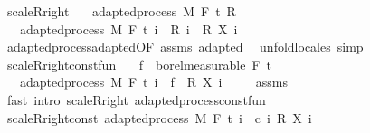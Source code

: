 \begin{isabellebody}
\ scaleR{\isacharunderscore}{\kern0pt}right{\isacharcolon}{\kern0pt}\isanewline
\ \ \ {\isachardoublequoteopen}adapted{\isacharunderscore}{\kern0pt}process\ M\ F\ t\ R{\isachardoublequoteclose}\isanewline
\ \ \ {\isachardoublequoteopen}adapted{\isacharunderscore}{\kern0pt}process\ M\ F\ t\ {\isacharparenleft}{\kern0pt}{\isasymlambda}i\ {\isasymxi}{\isachardot}{\kern0pt}\ {\isacharparenleft}{\kern0pt}R\ i\ {\isasymxi}{\isacharparenright}{\kern0pt}\ {\isacharasterisk}{\kern0pt}\isactrlsub R\ {\isacharparenleft}{\kern0pt}X\ i\ {\isasymxi}{\isacharparenright}{\kern0pt}{\isacharparenright}{\kern0pt}{\isachardoublequoteclose}\isanewline
%
\isadelimproof
\ \ %
\endisadelimproof
%
\isatagproof
{}\isamarkupfalse%
\ adapted{\isacharunderscore}{\kern0pt}process{\isachardot}{\kern0pt}adapted{\isacharbrackleft}{\kern0pt}OF\ assms{\isacharbrackright}{\kern0pt}\ adapted\ \isamarkupfalse%
\ {\isacharparenleft}{\kern0pt}unfold{\isacharunderscore}{\kern0pt}locales{\isacharparenright}{\kern0pt}\ simp%
\endisatagproof
{\isafoldproof}%
%
\isadelimproof
\isanewline
%
\endisadelimproof
\ \ \isanewline
{}\isamarkupfalse%
\ scaleR{\isacharunderscore}{\kern0pt}right{\isacharunderscore}{\kern0pt}const{\isacharunderscore}{\kern0pt}fun{\isacharcolon}{\kern0pt}\isanewline
\ \ \ {\isachardoublequoteopen}f\ {\isasymin}\ borel{\isacharunderscore}{\kern0pt}measurable\ {\isacharparenleft}{\kern0pt}F\ t\ \isanewline
\ \ \ {\isachardoublequoteopen}adapted{\isacharunderscore}{\kern0pt}process\ M\ F\ t\ {\isacharparenleft}{\kern0pt}{\isasymlambda}i\ {\isasymxi}{\isachardot}{\kern0pt}\ f\ {\isasymxi}\ {\isacharasterisk}{\kern0pt}\isactrlsub R\ {\isacharparenleft}{\kern0pt}X\ i\ {\isasymxi}{\isacharparenright}{\kern0pt}{\isacharparenright}{\kern0pt}{\isachardoublequoteclose}\isanewline
%
\isadelimproof
\ \ %
\endisadelimproof
%
\isatagproof
{}\isamarkupfalse%
\ assms\ \isamarkupfalse%
\ {\isacharparenleft}{\kern0pt}fast\ intro{\isacharcolon}{\kern0pt}\ scaleR{\isacharunderscore}{\kern0pt}right\ adapted{\isacharunderscore}{\kern0pt}process{\isacharunderscore}{\kern0pt}const{\isacharunderscore}{\kern0pt}fun{\isacharparenright}{\kern0pt}%
\endisatagproof
{\isafoldproof}%
%
\isadelimproof
\isanewline
%
\endisadelimproof
\isanewline
{}\isamarkupfalse%
\ scaleR{\isacharunderscore}{\kern0pt}right{\isacharunderscore}{\kern0pt}const{\isacharcolon}{\kern0pt}\ {\isachardoublequoteopen}adapted{\isacharunderscore}{\kern0pt}process\ M\ F\ t\ {\isacharparenleft}{\kern0pt}{\isasymlambda}i\ {\isasymxi}{\isachardot}{\kern0pt}\ c\ i\ {\isacharasterisk}{\kern0pt}\isactrlsub R\ {\isacharparenleft}{\kern0pt}X\ i\ {\isasymxi}{\isacharparenright}{\kern0pt}{\isacharparenright}{\kern0pt}{\isachardoublequoteclose}%

\end{isabellebody}
